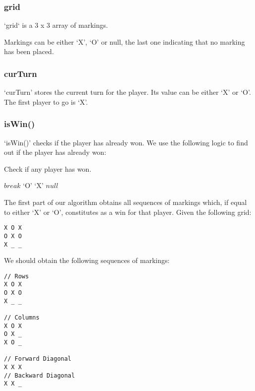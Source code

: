 \documentclass{article}
\newcommand{\qt}[1]{\mbox{`#1'}}
\begin{document}
\subsubsection{grid}

`grid` is a 3 x 3 array of markings.

Markings can be either `X', `O' or null, the last one indicating that no marking has been placed.

\subsubsection{curTurn}

`curTurn' stores the current turn for the player. Its value can be either `X' or `O'. The first player to go is `X'.

\subsubsection{isWin()}

`isWin()' checks if the player has already won. We use the following logic to find out if the player has already won:

\begin{algorithm}
\caption{Check if any player has won.}

\begin{algorithmic}[1]
      $break$
    \EndIf
  \EndFor
  \If{$seq[i + 1] = \qt{X}$}
    \Return $\qt{O}$
  \ElsIf{$seq[i + 1] = \qt{O}$}
    \Return $\qt{X}$
  \EndIf
\EndFor
\Return $null$
\EndProcedure
\end{algorithmic}
\end{algorithm}

The first part of our algorithm obtains all sequences of markings which, if equal to either `X' or `O', constitutes as a win for that player. Given the following grid:

\begin{verbatim}
X O X
O X O
X _ _
\end{verbatim}

We should obtain the following sequences of markings:

\begin{verbatim}
// Rows
X O X
O X O
X _ _

// Columns
X O X
O X _
X O _

// Forward Diagonal
X X X
// Backward Diagonal
X X _
\end{verbatim}
\end{document}
